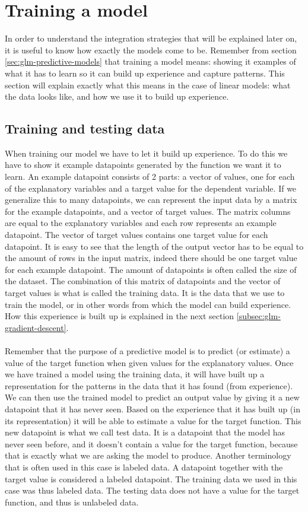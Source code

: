 \section{Training a model}
\label{sec:glm-trainingamodel}
In order to understand the integration strategies that will be explained later on, it is useful to know how exactly the models come to be. Remember from section \ref{sec:glm-predictive-models} that training a model means: showing it examples of what it has to learn so it can build up experience and capture patterns. This section will explain exactly what this means in the case of linear models: what the data looks like, and how we use it to build up experience.
\subsection{Training and testing data}
When training our model we have to let it build up experience. To do this we have to show it example datapoints generated by the function we want it to learn. An example datapoint consists of 2 parts: a vector of values, one for each of the explanatory variables and a target value for the dependent variable. If we generalize this to many datapoints, we can represent the input data by a matrix for the example datapoints, and a vector of target values. The matrix columns are equal to the explanatory variables and each row represents an example datapoint. The vector of target values contains one target value for each datapoint. It is easy to see that the length of the output vector has to be equal to the amount of rows in the input matrix, indeed there should be one target value for each example datapoint. The amount of datapoints is often called the size of the dataset. The combination of this matrix of datapoints and the vector of target values is what is called the training data. It is the data that we use to train the model, or in other words from which the model can build experience. How this experience is built up is explained in the next section \ref{subsec:glm-gradient-descent}. \\ \\
Remember that the purpose of a predictive model is to predict (or estimate) a value of the target function when given values for the explanatory values. Once we have trained a model using the training data, it will have built up a representation for the patterns in the data that it has found (from experience). We can then use the trained model to predict an output value by giving it a new datapoint that it has never seen. Based on the experience that it has built up (in its representation) it will be able to estimate a value for the target function. This new datapoint is what we call test data. It is a datapoint that the model has never seen before, and it doesn't contain a value for the target function, because that is exactly what we are asking the model to produce. Another terminology that is often used in this case is labeled data. A datapoint together with the target value is considered a labeled datapoint. The training data we used in this case was thus labeled data. The testing data does not have a value for the target function, and thus is unlabeled data.

